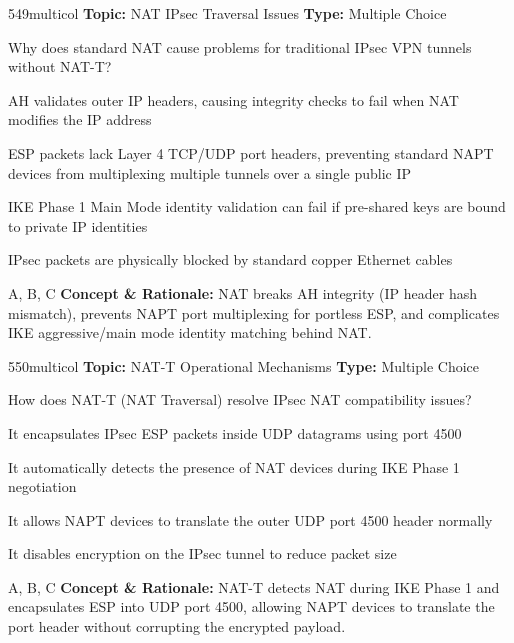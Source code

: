 \begin{qcard}{549}{multicol}
\textcolor{darkslate!75}{\small\textbf{Topic:} NAT IPsec Traversal Issues \hfill \textbf{Type:} Multiple Choice}\vspace{0.4em}\par
Why does standard NAT cause problems for traditional IPsec VPN tunnels without NAT-T?
\begin{qoptions}
\item AH validates outer IP headers, causing integrity checks to fail when NAT modifies the IP address
\item ESP packets lack Layer 4 TCP/UDP port headers, preventing standard NAPT devices from multiplexing multiple tunnels over a single public IP
\item IKE Phase 1 Main Mode identity validation can fail if pre-shared keys are bound to private IP identities
\item IPsec packets are physically blocked by standard copper Ethernet cables
\end{qoptions}
\end{qcard}
\nopagebreak
\begin{explainbox}{A, B, C}
\textbf{Concept \& Rationale:} NAT breaks AH integrity (IP header hash mismatch), prevents NAPT port multiplexing for portless ESP, and complicates IKE aggressive/main mode identity matching behind NAT.
\end{explainbox}

\begin{qcard}{550}{multicol}
\textcolor{darkslate!75}{\small\textbf{Topic:} NAT-T Operational Mechanisms \hfill \textbf{Type:} Multiple Choice}\vspace{0.4em}\par
How does NAT-T (NAT Traversal) resolve IPsec NAT compatibility issues?
\begin{qoptions}
\item It encapsulates IPsec ESP packets inside UDP datagrams using port 4500
\item It automatically detects the presence of NAT devices during IKE Phase 1 negotiation
\item It allows NAPT devices to translate the outer UDP port 4500 header normally
\item It disables encryption on the IPsec tunnel to reduce packet size
\end{qoptions}
\end{qcard}
\nopagebreak
\begin{explainbox}{A, B, C}
\textbf{Concept \& Rationale:} NAT-T detects NAT during IKE Phase 1 and encapsulates ESP into UDP port 4500, allowing NAPT devices to translate the port header without corrupting the encrypted payload.
\end{explainbox}

